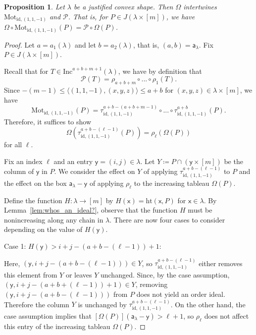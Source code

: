 \documentclass[12pt]{amsart}
\newcommand{\x}{\ensuremath{\mathsf{x}}}
\newcommand{\y}{\ensuremath{\mathsf{y}}}
\newcommand{\aaa}{\ensuremath{\mathsf{a}}}
\newtheorem{proposition}[theorem]{Proposition}
\theoremstyle{definition}
\theoremstyle{remark}
\numberwithin{equation}{section}
\newcommand{\inc}{\ensuremath{\mathrm{Inc}}}
\newcommand{\pro}{\mathcal{P}}
\newcommand{\mot}{\ensuremath{\mathrm{Mot}}}
\begin{document}
\begin{proposition}\label{prop:equivariant}
Let $\lambda$ be a justified convex shape. Then $\Omega$ intertwines $\mot_{\text{id},(1,1,-1)}$ and $\pro$. That is, for $P \in J(\lambda \times [m])$, we have $\Omega \circ \mot_{\text{id},(1,1,-1)}(P) = \pro \circ \Omega(P)$.
\end{proposition}
\begin{proof}
Let $a = a_1(\lambda)$ and let $b = a_2(\lambda)$, that is, $(a,b) = \aaa_{\lambda}$.  Fix $P \in J(\lambda \times [m])$. 

Recall that for $T \in \inc^{a+b+m+1}(\lambda)$, we have by definition that
\begin{equation*}
\pro(T) = \rho_{a+b+m} \circ  ... \circ \rho_1(T).
\end{equation*}
Since $-(m-1) \leq \langle (1,1,-1),(x,y,z) \rangle \leq a+b$ for $(x,y,z) \in \lambda \times [m]$, we have
\begin{equation*}
\mot_{\text{id},(1,1,-1)}(P) = \tau^{a+b-(a+b+m-1)}_{\text{id},(1,1,-1)} \circ ... \circ \tau^{a+b}_{\text{id},(1,1,-1)}(P).
\end{equation*}
Therefore, it suffices to show 
\begin{equation*}
\Omega \left(\tau^{a+b-(\ell-1)}_{\text{id},(1,1,-1)}(P) \right) = \rho_\ell \left(\Omega(P)\right)
\end{equation*}
for all $\ell$. 

Fix an index $\ell$ and an entry $\y = (i,j) \in \lambda$. Let $Y \coloneqq P \cap ( \y \times [m] )$ be the column of $\y$ in $P$. We consider the effect on $Y$ of applying $\tau^{a+b-(\ell-1)}_{\text{id},(1,1,-1)}$ to $P$  and the effect on the box $\aaa_\lambda - \y$ of applying $\rho_\ell$ to the increasing tableau $\Omega(P)$. 

Define the function $H : \lambda \to [m]$ by $H(\x) = \text{ht}(\x,P)$ for $\x \in \lambda$.
By Lemma~\ref{lem:whos_an_ideal?}, observe that the function $H$ must be nonincreasing along any chain in $\lambda$. 
There are now four cases to consider depending on the value of $H(\y)$.

\medskip
\noindent
{\sf Case 1: $H(\y) > i+j-(a+b-(\ell-1))+1$:} 

Here, $(\y,i+j-(a+b-(\ell-1))) \in Y$, so $\tau^{a+b-(\ell-1)}_{\text{id},(1,1,-1)}$ either removes this element from $Y$ or leaves $Y$ unchanged. Since, by the case assumption, $(\y,i+j-(a+b+(\ell-1))+1) \in Y$, removing $(\y,i+j-(a+b-(\ell-1)))$ from $P$ does not yield an order ideal. Therefore the column $Y$ is unchanged by $\tau^{a+b-(\ell-1)}_{\text{id},(1,1,-1)}$. On the other hand, the case assumption implies that $[\Omega(P)](\aaa_\lambda - \y) > \ell + 1$, so $\rho_{\ell}$ does not affect this entry of the increasing tableau $\Omega(P)$. 


\end{proof}
\end{document}

